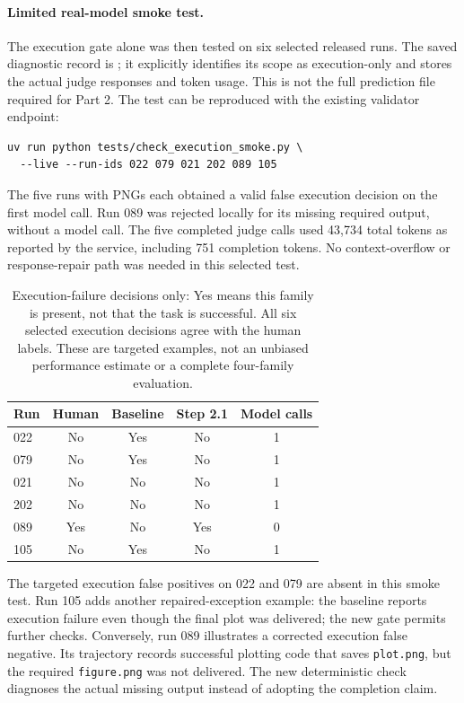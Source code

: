 \documentclass[11pt]{article}
\begin{document}
\paragraph{Limited real-model smoke test.}
The execution gate alone was then tested on six selected released runs.
The saved diagnostic record is
; it explicitly identifies its scope
as execution-only and stores the actual judge responses and token usage.
This is not the full prediction file required for Part 2.
The test can be reproduced with the existing validator endpoint:
\begin{verbatim}
uv run python tests/check_execution_smoke.py \
  --live --run-ids 022 079 021 202 089 105
\end{verbatim}
The five runs with PNGs each obtained a valid false execution decision on the
first model call. Run 089 was rejected locally for its missing required output,
without a model call. The five completed judge calls used 43,734 total tokens
as reported by the service, including 751 completion tokens.
No context-overflow or response-repair path was needed in this selected test.

\begin{table}[htbp]
\centering
\small
\begin{tabular}{lcccc}
\toprule
Run & Human & Baseline & Step 2.1 & Model calls \\
\midrule
022 & No  & Yes & No  & 1 \\
079 & No  & Yes & No  & 1 \\
021 & No  & No  & No  & 1 \\
202 & No  & No  & No  & 1 \\
089 & Yes & No  & Yes & 0 \\
105 & No  & Yes & No  & 1 \\
\bottomrule
\end{tabular}
\caption{Execution-failure decisions only: Yes means this family is present,
not that the task is successful. All six selected execution decisions agree
with the human labels. These are targeted examples, not an unbiased performance
estimate or a complete four-family evaluation.}
\label{tab:execution-smoke}
\end{table}

The targeted execution false positives on 022 and 079 are absent in this
smoke test. Run 105 adds another repaired-exception example: the baseline
reports execution failure even though the final plot was delivered; the new
gate permits further checks. Conversely, run 089 illustrates a corrected
execution false negative. Its trajectory records successful plotting code
that saves \texttt{plot.png}, but the required \texttt{figure.png} was not
delivered. The new deterministic check diagnoses the actual missing output
instead of adopting the completion claim.
\end{document}
